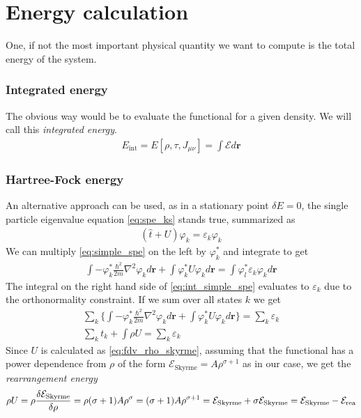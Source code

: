 \section{Energy calculation}
One, if not the most important physical quantity we want to compute is the total energy of the system.
\subsubsection{Integrated energy}
The obvious way would be to evaluate the functional for a given density. We will call this \textit{integrated energy}.
\begin{align*}
    E_\text{int} = E[\rho, \tau, J_{\mu\nu}]= \int \mathcal E d\mathbf r
\end{align*}
\subsubsection{Hartree-Fock energy}
An alternative approach can be used, as in a stationary point $\delta E = 0$, the single particle eigenvalue equation \ref{eq:spe_ks} stands true, summarized as 
\begin{align}
    \label{eq:simple_spe}
    (\hat t + U)\varphi_k = \varepsilon_k \varphi_k
\end{align}
We can multiply \ref{eq:simple_spe} on the left by $\varphi_k^*$ and integrate to get
\begin{align}
    \label{eq:int_simple_spe}
    \int -\varphi_k^* \frac{\hbar^2}{2m}\nabla^2\varphi_k d\bm r + \int \varphi_k^* U \varphi_k d\bm r = \int \varphi_l^* \varepsilon_k \varphi_k d\bm r
\end{align}
The integral on the right hand side of \ref{eq:int_simple_spe} evaluates to $\varepsilon_k$ due to the orthonormality constraint. If we sum over all states $k$ we get
\begin{align}
    \sum_k \bigg\{\int -\varphi_k^* \frac{\hbar^2}{2m}\nabla^2\varphi_k d\bm r + \int \varphi_k^* U \varphi_k d\bm r \bigg\}= \sum_k \varepsilon_k 
    \\\sum_k t_k + \int \rho U = \sum_k \varepsilon_k \label{eq:sum_spe}
\end{align}
Since $U$ is calculated as \ref{eq:fdv_rho_skyrme}, assuming that the functional has a power dependence from $\rho$ of the form $\mathcal E_\text{Skyrme} = A\rho^{\sigma+1}$ as in our case, we get the \textit{rearrangement energy}
\begin{align}
    \label{eq:sum_spe_new}
    \rho U = \rho \fdv{\mathcal E_\text{Skyrme}}{\rho} = \rho(\sigma +1)A \rho^\sigma = (\sigma+1)A \rho^{\sigma+1} = \mathcal E_\text{Skyrme} + \sigma \mathcal E_\text{Skyrme} = \mathcal E_\text{Skyrme} - \mathcal E_\text{rea}
\end{align}
